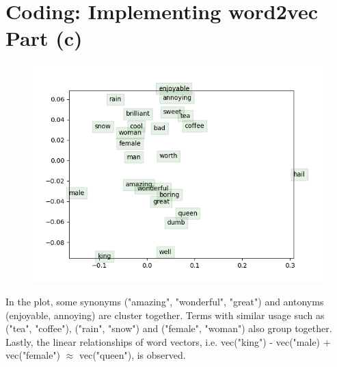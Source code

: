 \documentclass{article}
\begin{document}
\pagebreak

\section{Coding: Implementing word2vec Part (c)}

\begin{figure}[h]
    \includegraphics[width=12cm]{word_vectors.png}
    \centering
\end{figure}

In the plot, some synonyms ("amazing", "wonderful", "great") and antonyms (enjoyable, annoying) are cluster together. Terms with similar usage such as ("tea", "coffee"), ("rain", "snow") and ("female", "woman") also group together. Lastly, the linear relationships of word vectors, i.e. vec("king") - vec("male) + vec("female") $\approx$ vec("queen"), is observed.
\end{document}
